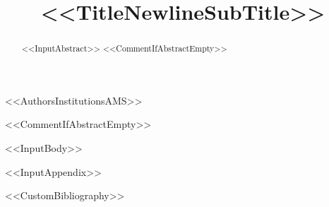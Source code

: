 \documentclass[<<DocumentClassOptions>>]{mcom-l}
\begin{document}
\title[<<ShortTitle>>]{<<TitleNewlineSubTitle>>}

<<AuthorsInstitutionsAMS>>
\gdef\shortauthors{<<AuthorsRunningHeadAMS>>}


\date{}


<<CommentIfAbstractEmpty>>\begin{abstract}
<<InputAbstract>>
<<CommentIfAbstractEmpty>>\end{abstract}

\maketitle

<<InputBody>>

\appendix
<<InputAppendix>>


<<CustomBibliography>>
\end{document}
